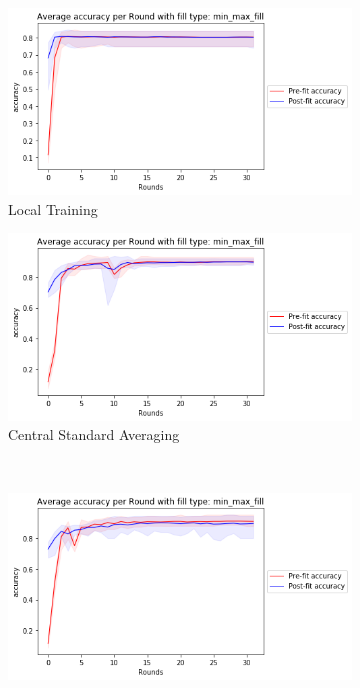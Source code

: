 \documentclass[12pt]{article}
\begin{document}
\begin{figure}[H]
\begin{subfigure}{0.45\textwidth}
\end{subfigure}%
\\
\begin{subfigure}{0.45\textwidth}
    \includegraphics[width=\textwidth]{resources/posture_localround-0.125-accuracy.png}
    \raggedleft
    \caption{\small Local Training}
\end{subfigure}
\begin{subfigure}{0.45\textwidth}
    \raggedleft
    \includegraphics[width=\textwidth]{resources/posture_centralround-0.125-accuracy.png}
    \caption{\small Central Standard Averaging}
\end{subfigure}%
\\
\begin{subfigure}{0.45\textwidth}
    \raggedleft
    \includegraphics[width=\textwidth]{resources/posture_stdround-0.125-accuracy.png}

\end{subfigure}
\end{figure}
\end{document}
